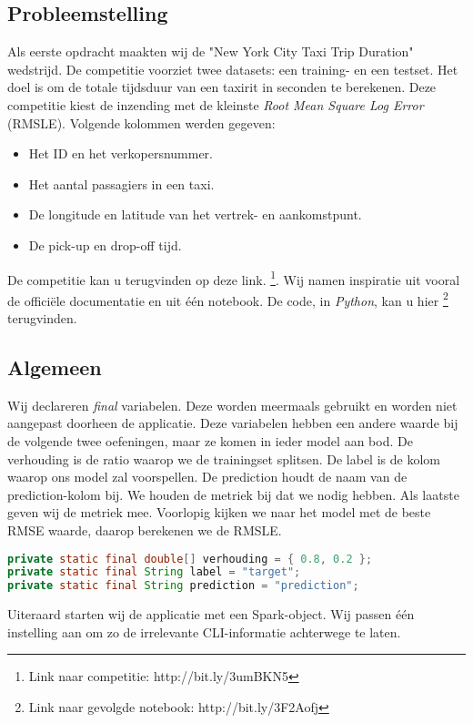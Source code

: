 \documentclass[a4paper,10pt,twoside]{report}
\begin{document}
\subsection*{Probleemstelling}

Als eerste opdracht maakten wij de "New York City Taxi Trip Duration" wedstrijd. De competitie voorziet twee datasets: een training- en een testset. Het doel is om de totale tijdsduur van een taxirit in seconden te berekenen. Deze competitie kiest de inzending met de kleinste \textit{Root Mean Square Log Error} (RMSLE). Volgende kolommen werden gegeven: 
\begin{itemize}
	\item Het ID en het verkopersnummer.
	\item Het aantal passagiers in een taxi.
	\item De longitude en latitude van het vertrek- en aankomstpunt.
	\item De pick-up en drop-off tijd.
\end{itemize}

De competitie kan u terugvinden op deze link. \footnote{Link naar competitie: http://bit.ly/3umBKN5}. Wij namen inspiratie uit vooral de officiële documentatie en uit één notebook. De code, in \textit{Python}, kan u hier \footnote{Link naar gevolgde notebook: http://bit.ly/3F2Aofj} terugvinden.

\subsection*{Algemeen}
Wij declareren \textit{final} variabelen. Deze worden meermaals gebruikt en worden niet aangepast doorheen de applicatie. Deze variabelen hebben een andere waarde bij de volgende twee oefeningen, maar ze komen in ieder model aan bod. De verhouding is de ratio waarop we de trainingset splitsen. De label is de kolom waarop ons model zal voorspellen. De prediction houdt de naam van de prediction-kolom bij. We houden de metriek bij dat we nodig hebben. Als laatste geven wij de metriek mee. Voorlopig kijken we naar het model met de beste RMSE waarde, daarop berekenen we de RMSLE.

\begin{lstlisting}[language=Java]
private static final double[] verhouding = { 0.8, 0.2 };
private static final String label = "target";
private static final String prediction = "prediction";
\end{lstlisting}

Uiteraard starten wij de applicatie met een Spark-object. Wij passen één instelling aan om zo de irrelevante CLI-informatie achterwege te laten.
\end{document}
